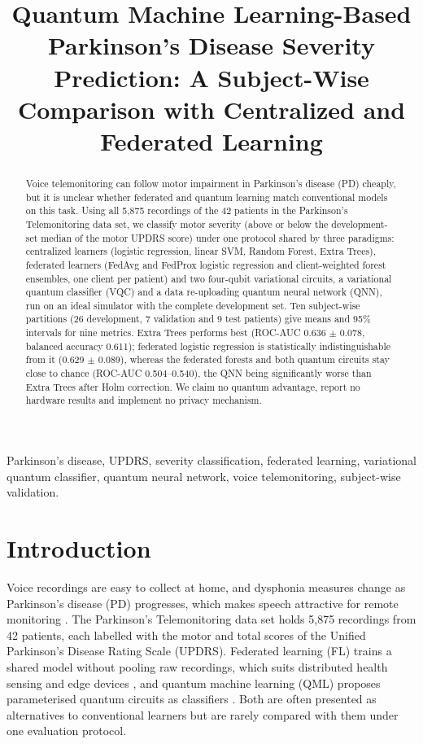 \documentclass[conference,a4paper]{IEEEtran}
\begin{document}
\title{Quantum Machine Learning-Based Parkinson's Disease Severity Prediction: A Subject-Wise Comparison with Centralized and Federated Learning}
\author{}
\maketitle
\begin{abstract}Voice telemonitoring can follow motor impairment in Parkinson's disease (PD) cheaply, but it is unclear whether federated and quantum learning match conventional models on this task. Using all 5,875 recordings of the 42 patients in the Parkinson's Telemonitoring data set, we classify motor severity (above or below the development-set median of the motor UPDRS score) under one protocol shared by three paradigms: centralized learners (logistic regression, linear SVM, Random Forest, Extra Trees), federated learners (FedAvg and FedProx logistic regression and client-weighted forest ensembles, one client per patient) and two four-qubit variational circuits, a variational quantum classifier (VQC) and a data re-uploading quantum neural network (QNN), run on an ideal simulator with the complete development set. Ten subject-wise partitions (26 development, 7 validation and 9 test patients) give means and 95\% intervals for nine metrics. Extra Trees performs best (ROC-AUC 0.636 $\pm$ 0.078, balanced accuracy 0.611); federated logistic regression is statistically indistinguishable from it (0.629 $\pm$ 0.089), whereas the federated forests and both quantum circuits stay close to chance (ROC-AUC 0.504--0.540), the QNN being significantly worse than Extra Trees after Holm correction. We claim no quantum advantage, report no hardware results and implement no privacy mechanism.\end{abstract}
\begin{IEEEkeywords}Parkinson's disease, UPDRS, severity classification, federated learning, variational quantum classifier, quantum neural network, voice telemonitoring, subject-wise validation.\end{IEEEkeywords}
\section{Introduction}
Voice recordings are easy to collect at home, and dysphonia measures change as Parkinson's disease (PD) progresses, which makes speech attractive for remote monitoring \cite{little2009,tsanas2010}. The Parkinson's Telemonitoring data set holds 5,875 recordings from 42 patients, each labelled with the motor and total scores of the Unified Parkinson's Disease Rating Scale (UPDRS). Federated learning (FL) trains a shared model without pooling raw recordings, which suits distributed health sensing and edge devices \cite{mcmahan2017,rieke2020}, and quantum machine learning (QML) proposes parameterised quantum circuits as classifiers \cite{havlicek2019,schuld2020}. Both are often presented as alternatives to conventional learners but are rarely compared with them under one evaluation protocol.
\end{document}
